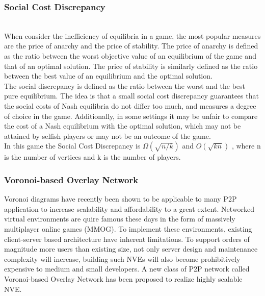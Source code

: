 \documentclass[12pt]{article}
\begin{document}
\subsubsection{Social Cost Discrepancy}\\

\indent \indent  When consider the inefficiency of equilibria in a game, the most popular measures are the price of anarchy and the price of stability. The price of anarchy is defined as the ratio between the worst objective value of an equilibrium of the game and that of an optimal solution. The price of stability is similarly defined as the ratio between the best value of an equilibrium and the optimal solution. \\

The social discrepancy is defined as the ratio between the worst and the best pure equilibrium. The idea is that a small social cost discrepancy guarantees that the social costs of Nash equilibria do not differ too much, and measures a degree of choice in the game. Additionally, in some settings it may be unfair to compare the cost of a Nash equilibrium with the optimal solution, which may not be attained by selfish players or may not be an outcome of the game.\\

In this game the Social Cost Discrepancy is $\Omega (\sqrt{n/k})$ and $O(\sqrt{kn})$ , where n is the number of vertices and k is the number of players.\\
\subsubsection{Voronoi-based Overlay Network}
\indent \indent Voronoi diagrams have recently been shown to be applicable to many P2P application to increase scalability and affordability to a great extent. Networked virtual environments are quire famous these days in the form of massively multiplayer online games (MMOG). To implement these environments, existing client-server based architecture have inherent limitations. To support orders of magnitude more users than existing size, not only server design and maintenance complexity will increase, building such NVEs will also become prohibitively expensive to medium and small developers. A new class of P2P network called Voronoi-based Overlay Network has been proposed to realize highly scalable NVE. \\
\end{document}
